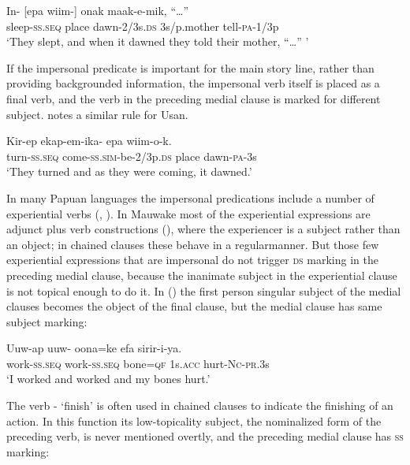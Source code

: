 \ea%
\label{ex:x1475}
\gll In-  [epa  wiim-]  onak  maak-e-mik,  ``{\dots''}\\
sleep-\textsc{ss}.\textsc{seq} place dawn-2/3s.\textsc{ds} 3s/p.mother  tell-\textsc{pa}-1/3p\\
\glt`They slept, and when it dawned they told their mother, ``{\dots}'' '
\z


If the impersonal predicate is important for the main story line, rather than providing backgrounded information, the impersonal verb itself is placed as a final verb, and the verb in the preceding medial clause is marked for different subject. \citet[206]{Reesink1987} notes a similar rule for Usan. 

\ea%
\label{ex:x1492}
\gll Kir-ep  ekap-em-ika-  epa  wiim-o-k. \\
turn-\textsc{ss}.\textsc{seq} come-\textsc{ss}.\textsc{sim}-be-2/3p.\textsc{ds} place dawn-\textsc{pa}-3s\\
\glt`They turned and as they were coming, it dawned.'
\z


In many Papuan languages the impersonal predications include a number of experiential verbs (\citealt[204]{Reesink1987}, \citealt{Roberts1997}). In Mauwake most of the experiential expressions are adjunct plus verb constructions (), where the experiencer is a subject rather than an object; in chained clauses these behave in a regular\textstyleAcronymallcaps manner. But those few experiential expressions that are impersonal do not trigger \textsc{ds} marking in the preceding medial clause, because the inanimate subject in the experiential clause is not topical enough to do it. In () the first person singular subject of the medial clauses becomes the object of the final clause, but the medial clause has same subject marking:

\ea%
\label{ex:x1491}
\gll Uuw-ap uuw- oona=ke efa  sirir-i-ya.\\
work-\textsc{ss}.\textsc{seq} work-\textsc{ss}.\textsc{seq} bone=\textsc{qf} 1s.\textsc{acc} hurt-\textsc{Nc}-\textsc{pr}.3s\\
\glt`I worked and worked and my bones hurt.'
\z


The verb - `finish' is often used in chained clauses to indicate the finishing of an action. In this function its low-topicality subject, the nominalized form of the preceding verb, is never mentioned overtly, and the preceding medial clause has \textsc{ss} marking:


